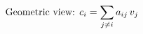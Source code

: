 \documentclass[preview]{standalone}
\begin{document}
\begin{align*}
\special{dvisvgm:raw <g id='unique000'>}\text{Geometric view: } c_i = \sum_{j \ne i} a_{ij}\, v_j\special{dvisvgm:raw </g>}
\end{align*}
\end{document}
